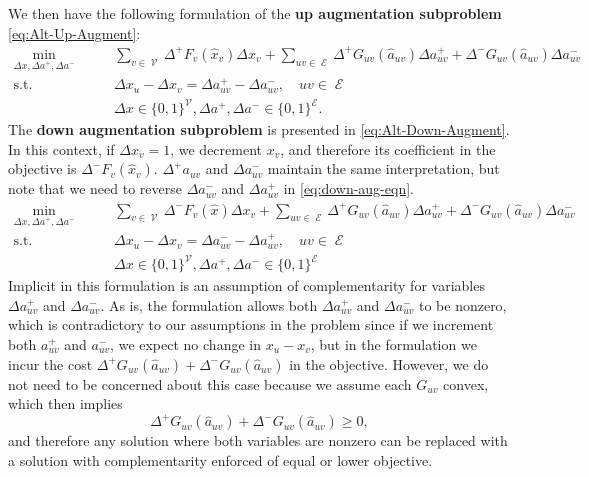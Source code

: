 \documentclass[pdflatex,sn-mathphys-num]{sn-jnl}%
\DeclareMathOperator{\Ecal}{\mathcal{E}}
\DeclareMathOperator{\Vcal}{\mathcal{V}}
\begin{document}
We then have the following formulation of the \textbf{up augmentation subproblem} \eqref{eq:Alt-Up-Augment}:
\begin{subequations}
\begin{align}
    \min_{\Delta x,\Delta a^+,\Delta a^-} \qquad & \sum_{v \in \Vcal} \Delta^+ F_v(\hat{x}_v)\Delta x_v + \sum_{uv \in \Ecal}\Delta^+ G_{uv}(\hat{a}_{uv})\Delta a_{uv}^+ + \Delta^-G_{uv}(\hat{a}_{uv})\Delta a_{uv}^-  \\
    \text{s.t.} \qquad& \Delta x_u - \Delta x_v = \Delta a_{uv}^+ - \Delta a_{uv}^-, \quad uv \in \Ecal \\
    &\Delta x \in \{0,1\}^{\Vcal}, \Delta a^+, \Delta a^- \in \{0,1\}^{\Ecal}.
\end{align} \label{eq:Alt-Up-Augment}%
\end{subequations}
The \textbf{down augmentation subproblem} is presented in \eqref{eq:Alt-Down-Augment}. In this context, if $\Delta x_v=1$, we decrement $x_v$, and therefore its coefficient in the objective is $\Delta^-F_v(\hat{x}_v)$. $\Delta^+a_{uv}$ and $\Delta a^-_{uv}$ maintain the same interpretation, but note that we need to reverse $\Delta a^-_{uv}$ and $\Delta a^+_{uv}$ in \eqref{eq:down-aug-eqn}.
\begin{subequations}
\begin{align}
    \min_{\Delta x,\Delta a^+,\Delta a^-} \qquad & \sum_{v \in \Vcal} \Delta^-F_v(\hat{x})\Delta x_v + \sum_{uv \in \Ecal}\Delta^+G_{uv}(\hat{a}_{uv})\Delta a_{uv}^+ + \Delta^-G_{uv}(\hat{a}_{uv})\Delta a_{uv}^- \\
    \text{s.t.} \qquad& \Delta x_u - \Delta x_v = \Delta a_{uv}^- - \Delta a_{uv}^+, \quad uv \in \Ecal \label{eq:down-aug-eqn}\\
    &\Delta x \in \{0,1\}^{\Vcal}, \Delta a^+, \Delta a^- \in \{0,1\}^{\Ecal}
\end{align} \label{eq:Alt-Down-Augment}%
\end{subequations}
Implicit in this formulation is an assumption of complementarity for variables $\Delta a^+_{uv}$ and $\Delta a^-_{uv}$. 
As is, the formulation allows both $\Delta a_{uv}^+$ and $\Delta a_{uv}^-$ to be nonzero, which is contradictory to our assumptions in the problem since if we increment both $a^+_{uv}$ and $a^-_{uv}$, we expect no change in $x_u - x_v$, but in the formulation we incur the cost $\Delta^+ G_{uv}(\hat{a}_{uv}) + \Delta^- G_{uv}(\hat{a}_{uv})$ in the objective. 
However, we do not need to be concerned about this case because we assume each $G_{uv}$ convex, which then implies
\begin{equation}
    \Delta^+ G_{uv}(\hat{a}_{uv}) + \Delta^- G_{uv}(\hat{a}_{uv}) \ge 0,
\end{equation}
and therefore any solution where both variables are nonzero can be replaced with a solution with complementarity enforced of equal or lower objective.
\end{document}
